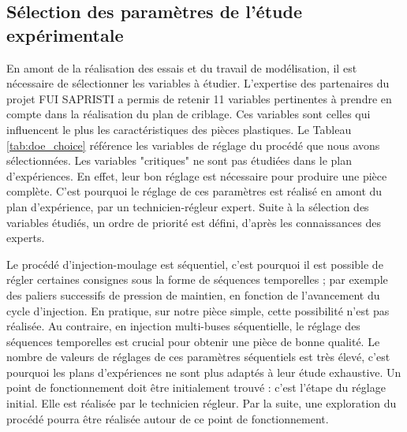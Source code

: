 


\subsection{Sélection des paramètres de l'étude expérimentale} \label{subsec:l12_doe}
En amont de la réalisation des essais et du travail de modélisation, il est nécessaire de sélectionner les variables à étudier.
L'expertise des partenaires du projet FUI SAPRISTI a permis de retenir 11 variables pertinentes à prendre en compte dans la réalisation du plan de criblage.
Ces variables sont celles qui influencent le plus les caractéristiques des pièces plastiques.
Le Tableau \ref{tab:doe_choice} référence les variables de réglage du procédé que nous avons sélectionnées.
Les variables "critiques" ne sont pas étudiées dans le plan d'expériences.
En effet, leur bon réglage est nécessaire pour produire une pièce complète.
C'est pourquoi le réglage de ces paramètres est réalisé en amont du plan d'expérience, par un technicien-régleur expert.
Suite à la sélection des variables étudiés, un ordre de priorité est défini, d'après les connaissances des experts.

Le procédé d'injection-moulage est séquentiel, c'est pourquoi il est possible de régler certaines consignes sous la forme de séquences temporelles ; par exemple des paliers successifs de pression de maintien, en fonction de l'avancement du cycle d'injection.
En pratique, sur notre pièce simple, cette possibilité n'est pas réalisée.
Au contraire, en injection multi-buses séquentielle, le réglage des séquences temporelles est crucial pour obtenir une pièce de bonne qualité.
Le nombre de valeurs de réglages de ces paramètres séquentiels est très élevé, c'est pourquoi les plans d'expériences ne sont plus adaptés à leur étude exhaustive.
Un point de fonctionnement doit être initialement trouvé : c'est l'étape du réglage initial.
Elle est réalisée par le technicien régleur.
Par la suite, une exploration du procédé pourra être réalisée autour de ce point de fonctionnement.

